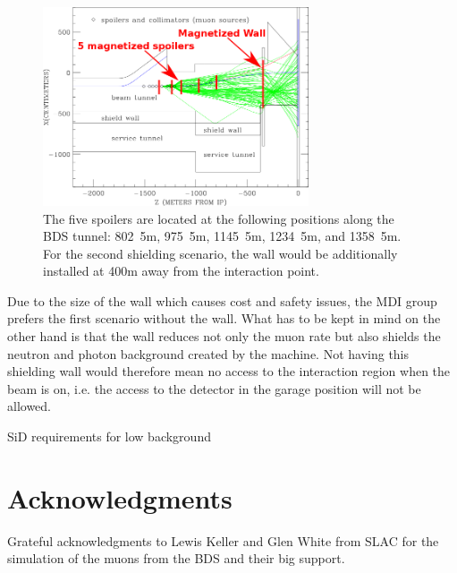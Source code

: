 \documentclass[12pt]{article}
\begin{document}
\begin{figure}
    \centering
    \includegraphics[width=0.7\textwidth]{figures/BDS_Tunnel_Spoilers+Wall.png}
    \caption[BDS tunnel with the spoiler and wall positions]{
    The five spoilers are located at the following positions along the BDS tunnel: \unit{802.5}{m}, \unit{975.5}{m}, \unit{1145.5}{m}, \unit{1234.5}{m}, and \unit{1358.5}{m}.
    For the second shielding scenario, the wall would be additionally installed at \unit{400}{m} away from the interaction point.
    }
    \label{fig:Spoilers_Wall_Locations}
\end{figure}

Due to the size of the wall which causes cost and safety issues, the MDI group prefers the first scenario without the wall.
What has to be kept in mind on the other hand is that the wall reduces not only the muon rate but also shields the neutron and photon background created by the machine.
Not having this shielding wall would therefore mean no access to the interaction region when the beam is on, i.e. the access to the detector in the garage position will not be allowed.


SiD requirements for low background







\section*{Acknowledgments}
Grateful acknowledgments to Lewis Keller and Glen White from SLAC for the simulation of the muons from the BDS and their big support.






\end{document}
